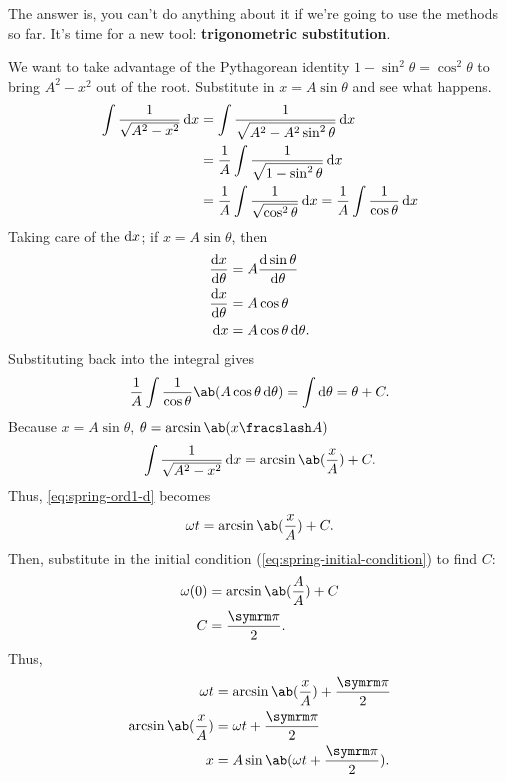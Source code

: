 The answer is, you can't do anything about it if we're going to use the methods so far. It's time for a new tool: \textbf{trigonometric substitution}.

We want to take advantage of the Pythagorean identity \(1 - \sin^2\theta = \cos^2\theta\) to bring \(A^2 - x^2\) out of the root. Substitute in \(x = A\sin\theta\) and see what happens.
\begin{align}
  \int\frac{1}{\sqrt{A^2 - x^2}}\odif{x} & = \int\frac{1}{\sqrt{A^2 - A^2\sin^2\theta}}\odif{x}                                                 \\
                                         & = \frac{1}{A}\int\frac{1}{\sqrt{1 - \sin^2\theta}}\odif{x}                                           \\
                                         & = \frac{1}{A}\int\frac{1}{\sqrt{\cos^2\theta}}\odif{x} = \frac{1}{A}\int\frac{1}{\cos\theta}\odif{x}
\end{align}
Taking care of the \(\odif{x}\); if \(x = A\sin\theta\), then
\begin{align}
  \odv{x}{\theta} & = A\odv{\sin\theta}{\theta} \\
  \odv{x}{\theta} & = A\cos\theta               \\
  \odif{x}        & = A\cos\theta\odif{\theta}.
\end{align}
Substituting back into the integral gives
\begin{equation}
  \frac{1}{A}\int\frac{1}{\cos\theta}\ab(A\cos\theta\odif{\theta}) = \int\odif{\theta} = \theta + C.
\end{equation}
Because \(x = A\sin\theta\), \(\theta = \arcsin\ab(\flatfrac{x}{A})\)
\begin{equation}
  \int\frac{1}{\sqrt{A^2 - x^2}}\odif{x} = \arcsin\ab(\frac{x}{A}) + C.
\end{equation}
Thus, \cref{eq:spring-ord1-d} becomes
\begin{equation}
  \omega t = \arcsin\ab(\frac{x}{A}) + C.
\end{equation}
Then, substitute in the initial condition (\cref{eq:spring-initial-condition}) to find \(C\):
\begin{align}
  \omega(0) & = \arcsin\ab(\frac{A}{A}) + C \\
  C         & = \frac{\cpi}{2}.
\end{align}
Thus,
\begin{align}
  \omega t                & = \arcsin\ab(\frac{x}{A}) + \frac{\cpi}{2} \\
  \arcsin\ab(\frac{x}{A}) & = \omega t + \frac{\cpi}{2}                \\
  x                       & = A\sin\ab(\omega t + \frac{\cpi}{2}).
\end{align}
